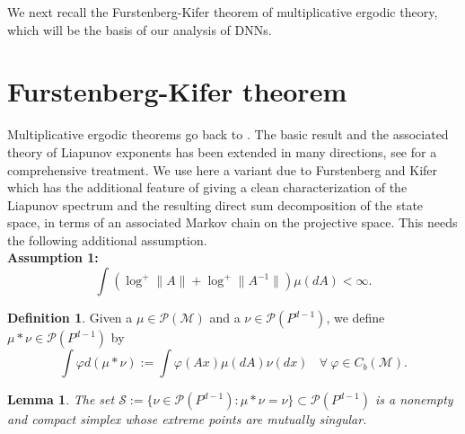 \documentclass[12pt]{amsart}
\theoremstyle{plain}
\newtheorem{lemma}[theorem]{Lemma}
\theoremstyle{definition}
\newtheorem{definition}[theorem]{Definition}
\theoremstyle{remark}
\newcommand{\M}{\mathcal{M}}
\newcommand{\PA}{\mathcal{P}}
\newcommand{\SA}{\mathcal{S}}
\newcommand{\0}{\textbf{0}}
\begin{document}
\medskip

We next recall the Furstenberg-Kifer theorem of multiplicative ergodic theory, which will be the basis of our analysis of DNNs.


\section{Furstenberg-Kifer theorem}\label{main}

Multiplicative ergodic theorems go back to \cite{Osel}. The basic result and the associated theory of Liapunov exponents has been extended in many directions, see \cite{Arnold} for a comprehensive treatment. We use here a variant due to Furstenberg and Kifer \cite{FK} which has the additional feature of giving a clean characterization of the Liapunov spectrum and the resulting direct sum decomposition of the state space, in terms of an associated Markov chain on the projective space. This needs the following additional assumption.\\

\noindent \textbf{Assumption 1:}\label{Ass} $$\int\left(\log^+\|A\| + \log^+\|A^{-1}\|\right)\mu(dA) < \infty.$$

\medskip


%

\begin{definition}\label{MKernel} Given a $\mu \in \PA(\M)$ and a $\nu \in \PA(P^{d-1})$, we define $\mu*\nu \in \PA(P^{d-1})$ by
\begin{equation}
\int \varphi d(\mu*\nu) := \int \varphi(Ax)\mu(dA)\nu(dx) \ \ \ \ \forall \ \varphi \in C_b(\M). \label{star}
\end{equation}
\end{definition}

\medskip

\begin{lemma}\label{extreme} The set $\SA := \{\nu \in \PA(P^{d-1}) : \mu*\nu = \nu\} \subset \PA(P^{d-1})$ is a nonempty  and compact simplex whose extreme points are mutually singular. \end{lemma}
\end{document}
